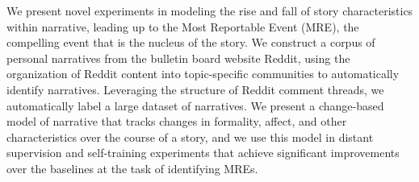 We present novel experiments in modeling the rise and fall of story characteristics within narrative, leading up to the Most Reportable Event (MRE), the compelling event that is the nucleus of the story. We construct a corpus of personal narratives from the bulletin board website Reddit, using the organization of Reddit content into topic-specific communities to automatically identify narratives. Leveraging the structure of Reddit comment threads, we automatically label a large dataset of narratives. We present a change-based model of narrative that tracks changes in formality, affect, and other characteristics over the course of a story, and we use this model in distant supervision and self-training experiments that achieve significant improvements over the baselines at the task of identifying MREs.
